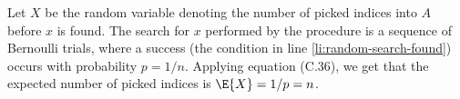 Let $X$ be the random variable denoting the number of picked indices into $A$ before $x$ is found.
The search for $x$ performed by the procedure  is a sequence of Bernoulli trials, where a success (the condition in line \ref{li:random-search-found}) occurs with probability $p=1/n$.
Applying equation (C.36), we get that the expected number of picked indices is $\E{X}=1/p=n$.
